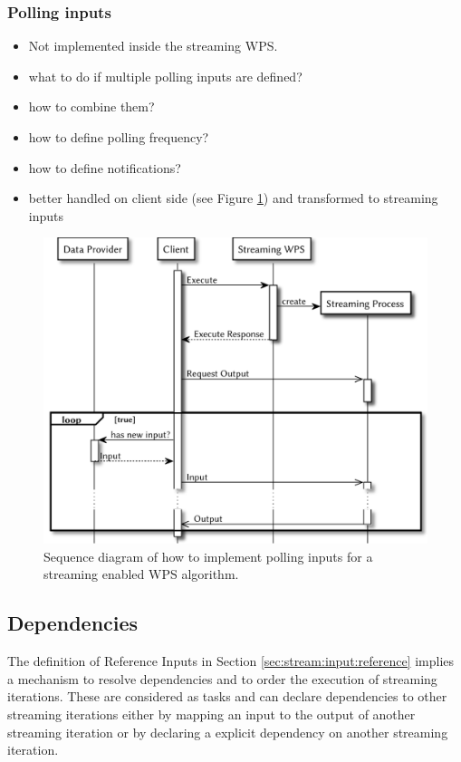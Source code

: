 		\subsubsection{Polling inputs}
			\label{sec:stream:input:polling}
			\begin{itemize}
				\item Not implemented inside the streaming WPS.
				\item what to do if multiple polling inputs are defined?
				\item how to combine them?
				\item how to define polling frequency?
				\item how to define notifications?
				\item better handled on client side (see Figure \ref{fig:sd:polling}) and transformed to streaming inputs
			\end{itemize}
			\begin{figure}[!htb]
				\centering
				\includegraphics[width=.7868\textwidth]{figures/sequence-diagramm-polling.pdf}
				\caption{\label{fig:sd:polling} Sequence diagram of how to implement polling inputs for a streaming enabled \ac{WPS} algorithm.}
			\end{figure}

	\subsection{Dependencies}
		\label{sec:stream:dependencies}
		The definition of Reference Inputs in Section \ref{sec:stream:input:reference} implies a mechanism to resolve dependencies and to order the execution of streaming iterations. These are considered as tasks and can declare dependencies to other streaming iterations either by mapping an input to the output of another streaming iteration or by declaring a explicit dependency on another streaming iteration.


